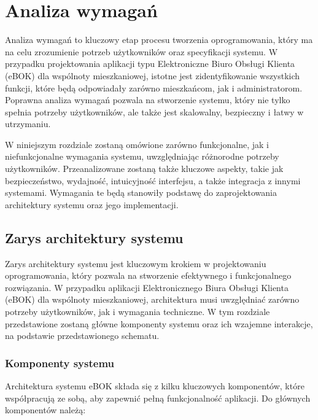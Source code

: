 \chapter{Analiza wymagań}

Analiza wymagań to kluczowy etap procesu tworzenia oprogramowania, który ma na celu zrozumienie potrzeb użytkowników oraz specyfikacji systemu. W przypadku projektowania aplikacji typu Elektroniczne Biuro Obsługi Klienta (eBOK) dla wspólnoty mieszkaniowej, istotne jest zidentyfikowanie wszystkich funkcji, %
które będą odpowiadały zarówno mieszkańcom, jak i administratorom. Poprawna analiza wymagań pozwala na stworzenie systemu, który nie tylko spełnia potrzeby użytkowników, ale także jest skalowalny, bezpieczny i łatwy w utrzymaniu.

W niniejszym rozdziale zostaną omówione zarówno funkcjonalne, jak i niefunkcjonalne wymagania systemu, uwzględniając różnorodne potrzeby użytkowników. Przeanalizowane zostaną także kluczowe aspekty, takie jak bezpieczeństwo, wydajność, intuicyjność interfejsu, a także integracja z innymi systemami. Wymagania te będą stanowiły podstawę do zaprojektowania architektury systemu oraz jego implementacji.

\section{Zarys architektury systemu}
Zarys architektury systemu jest kluczowym krokiem w projektowaniu oprogramowania, który pozwala na stworzenie efektywnego i funkcjonalnego rozwiązania. W przypadku aplikacji Elektronicznego Biura Obsługi Klienta (eBOK) dla wspólnoty mieszkaniowej, architektura musi uwzględniać zarówno potrzeby użytkowników, jak i wymagania techniczne. W tym rozdziale przedstawione zostaną główne komponenty systemu oraz ich wzajemne interakcje, na podstawie przedstawionego schematu.

\subsection{Komponenty systemu}

Architektura systemu eBOK składa się z kilku kluczowych komponentów, które współpracują ze sobą, aby zapewnić pełną funkcjonalność aplikacji. Do głównych komponentów należą:

